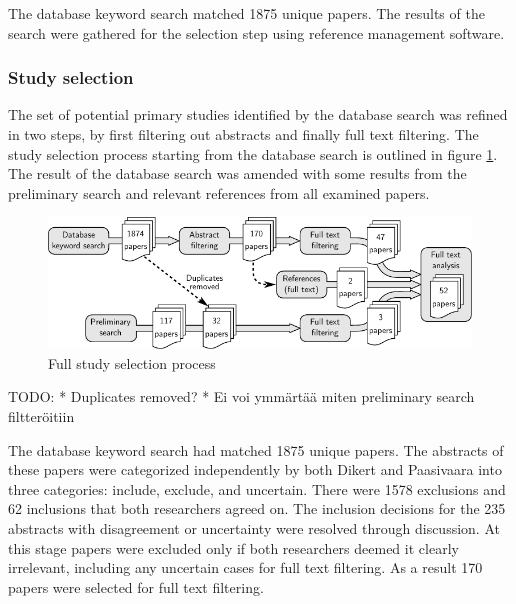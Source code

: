 \documentclass[preprint,authoryear,12pt]{elsarticle}
\begin{document}
The database keyword search matched 1875 unique papers. The results of the
search were gathered for the selection step using reference management software.


\subsubsection{Study selection}

The set of potential primary studies identified by the database search was
refined in two steps, by first filtering out abstracts and finally full text
filtering. The study selection process starting from the database search is
outlined in figure \ref{fig:selectionprocess_full}. The result of the database
search was amended with some results from the preliminary search and relevant
references from all examined papers.

\begin{figure}
  \begin{center}
    \includegraphics[width=1\textwidth]{graphics/research_process_full.pdf}
    \caption{Full study selection process}
    \label{fig:selectionprocess_full}
  \end{center}
\end{figure}


TODO:
* Duplicates removed?
* Ei voi ymmärtää miten preliminary search filtteröitiin


The database keyword search had matched 1875 unique papers. The abstracts of
these papers were categorized independently by both Dikert and Paasivaara into
three categories: include, exclude, and uncertain. There were 1578 exclusions
and 62 inclusions that both researchers agreed on. The inclusion decisions
for the 235 abstracts with disagreement or uncertainty were resolved through
discussion. At this stage papers were excluded only if both researchers deemed
it clearly irrelevant, including any uncertain cases for full text filtering. As
a result 170 papers were selected for full text filtering.

%
%
%
%
%
%
\end{document}
